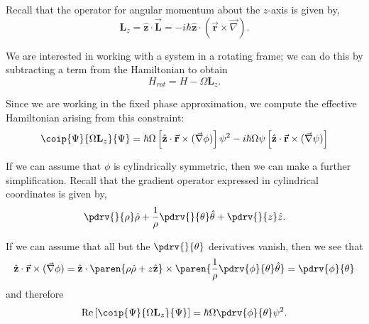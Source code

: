 \documentclass[onecolumn,,amsmath,amssymb,nofootinbib,floatfix]{revtex4}
\begin{document}
Recall that the operator for angular momentum about the $z$-axis is given by,
$$\textbf{L}_z = \hat{\textbf{z}}\cdot \vec{\textbf{L}} = -i\hbar\hat{\textbf{z}}\cdot (\vec{\textbf{r}}\times\vec{\nabla}).$$

We are interested in working with a system in a rotating frame;  we can do this by subtracting a term from the Hamiltonian to obtain
$$H_{rot} = H - \Omega \textbf{L}_z.$$

Since we are working in the fixed phase approximation, we compute the effective Hamiltonian arising from this constraint:
$$\coip{\Psi}{\Omega\textbf{L}_z}{\Psi} = \hbar\Omega\left[\hat{\textbf{z}}\cdot\vec{\textbf{r}}\times(\vec{\nabla}\phi)\right]\psi^2-i\hbar\Omega\psi\left[\hat{\textbf{z}}\cdot\vec{\textbf{r}}\times(\vec{\nabla}\psi)\right]$$

If we can assume that $\phi$ is cylindrically symmetric, then we can make a further simplification.  Recall that the gradient operator expressed in cylindrical coordinates is given by,
$$\pdrv{}{\rho}\hat\rho + \frac{1}{\rho}\pdrv{}{\theta}\hat\theta + \pdrv{}{z}\hat z.$$

If we can assume that all but the $\pdrv{}{\theta}$ derivatives vanish, then we see that
$$
\begin{aligned}
\hat{\textbf{z}}\cdot\vec{\textbf{r}}\times(\vec{\nabla}\phi)
= \hat{\textbf{z}}\cdot\paren{\rho \hat{\rho} + z\hat{\textbf{z}}}\times\paren{\frac{1}{\rho}\pdrv{\phi}{\theta}\hat\theta}
= \pdrv{\phi}{\theta}\\ 
\end{aligned}
$$
and therefore
$$\text{Re}\left[\coip{\Psi}{\Omega \textbf{L}_z}{\Psi}\right] = \hbar \Omega\pdrv{\phi}{\theta}\psi^2.$$
\end{document}
